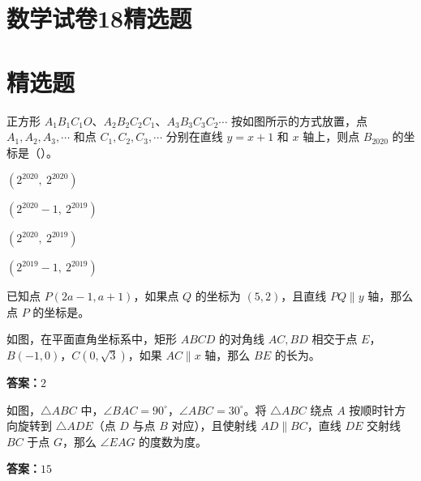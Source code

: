 \documentclass{exam-zh}
\newcommand{\answerarea}[1][40mm]{%
  \vspace{2mm}%
  \begin{tcolorbox}[
    enhanced, breakable,
    colback=white,
    colframe=white,
    boxrule=0pt,
    height=#1,
    valign=top,
    bottom=0mm,
    after skip=0mm,
  ]
  \end{tcolorbox}%
}
\newcounter{solstep}
\begin{document}
\section*{数学试卷18精选题}

\section*{精选题}


\begin{question}[points=4]
  正方形 $A_1B_1C_1O$、$A_2B_2C_2C_1$、$A_3B_3C_3C_2\cdots$ 按如图所示的方式放置，点 $A_1,A_2,A_3,\cdots$ 和点 $C_1,C_2,C_3,\cdots$ 分别在直线 $y=x+1$ 和 $x$ 轴上，则点 $B_{2020}$ 的坐标是（\quad）。
  \begin{choices}
    \item $(2^{2020},\ 2^{2020})$
    \item $(2^{2020}-1,\ 2^{2019})$
    \item $(2^{2020},\ 2^{2019})$
    \item $(2^{2019}-1,\ 2^{2019})$
  \end{choices}
  \paren[B]
\end{question}



\begin{question}[points=4]
  已知点 $P(2a-1,a+1)$，如果点 $Q$ 的坐标为 $(5,2)$，且直线 $PQ\parallel y$ 轴，那么点 $P$ 的坐标是\underline{\hspace{22mm}}。
  \paren[$(5,4)$]
\end{question}



\begin{problem}[points=4]
  如图，在平面直角坐标系中，矩形 $ABCD$ 的对角线 $AC,BD$ 相交于点 $E$，$B(-1,0)$，$C(0,\sqrt3)$，如果 $AC\parallel x$ 轴，那么 $BE$ 的长为\underline{\hspace{18mm}}。
  \answerarea[24mm]
  \setcounter{solstep}{0}
  \begin{solutionblock}
    \textbf{答案：}$2$\par\medskip
  \end{solutionblock}
\end{problem}



\begin{problem}[points=4]
  如图，$\triangle ABC$ 中，$\angle BAC=90^\circ$，$\angle ABC=30^\circ$。将 $\triangle ABC$ 绕点 $A$ 按顺时针方向旋转到 $\triangle ADE$（点 $D$ 与点 $B$ 对应），且使射线 $AD\parallel BC$，直线 $DE$ 交射线 $BC$ 于点 $G$，那么 $\angle EAG$ 的度数为\underline{\hspace{18mm}}度。
  \answerarea[26mm]
  \setcounter{solstep}{0}
  \begin{solutionblock}
    \textbf{答案：}$15$\par\medskip
  \end{solutionblock}
\end{problem}
\end{document}
